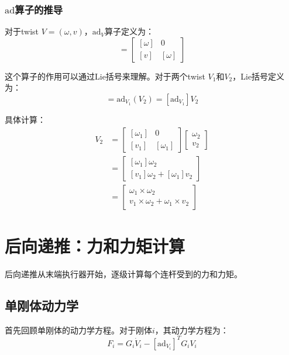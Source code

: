\documentclass[12pt,a4paper]{article}
\begin{document}
\subsubsection{$\text{ad}$算子的推导}

对于twist $V = (\omega, v)$，$\text{ad}_V$算子定义为：
\begin{equation}
[\text{ad}_V] = \begin{bmatrix}
[\omega] & 0 \\
[v] & [\omega]
\end{bmatrix}
\end{equation}

这个算子的作用可以通过Lie括号来理解。对于两个twist $V_1$和$V_2$，Lie括号定义为：
\begin{equation}
[V_1, V_2] = \text{ad}_{V_1}(V_2) = [\text{ad}_{V_1}] V_2
\end{equation}

具体计算：
\begin{align}
[\text{ad}_{V_1}] V_2 &= \begin{bmatrix}
[\omega_1] & 0 \\
[v_1] & [\omega_1]
\end{bmatrix} \begin{bmatrix}
\omega_2 \\
v_2
\end{bmatrix} \\
&= \begin{bmatrix}
[\omega_1] \omega_2 \\
[v_1] \omega_2 + [\omega_1] v_2
\end{bmatrix} \\
&= \begin{bmatrix}
\omega_1 \times \omega_2 \\
v_1 \times \omega_2 + \omega_1 \times v_2
\end{bmatrix}
\end{align}

\section{后向递推：力和力矩计算}

后向递推从末端执行器开始，逐级计算每个连杆受到的力和力矩。

\subsection{单刚体动力学}

首先回顾单刚体的动力学方程。对于刚体$i$，其动力学方程为：
\begin{equation}
F_i = G_i \dot{V}_i - [\text{ad}_{V_i}]^T G_i V_i
\label{eq:rigid_body_dynamics}
\end{equation}
\end{document}
